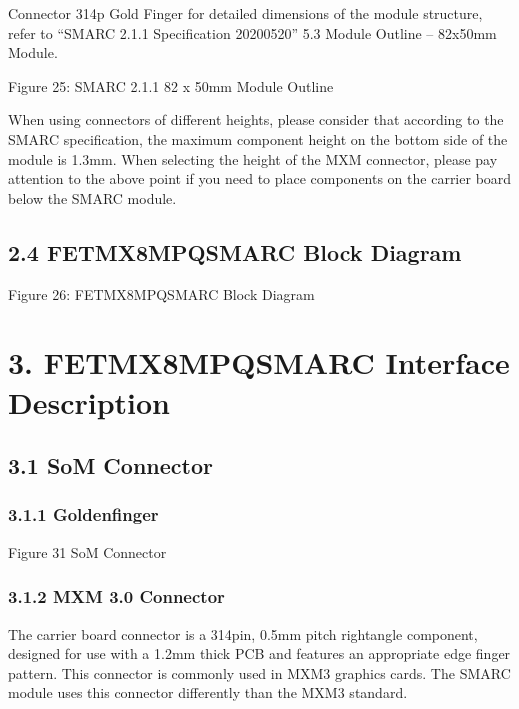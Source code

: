 \documentclass[letterpaper,10pt,openany,english]{sphinxmanual}
\begin{document}
\sphinxAtStartPar
Connector 314p Gold Finger for detailed dimensions of the module structure, refer to “SMARC 2.1.1 Specification 2020\sphinxhyphen{}05\sphinxhyphen{}20” 5.3 Module Outline – 82x50mm Module.

\sphinxAtStartPar
Figure 2\sphinxhyphen{}5: SMARC 2.1.1 82 x 50mm Module Outline

\sphinxAtStartPar
When using connectors of different heights, please consider that according to the SMARC specification, the maximum component height on the bottom side of the module is 1.3mm. When selecting the height of the MXM connector, please pay attention to the above point if you need to place components on the carrier board below the SMARC module.


\section{2.4 FET\sphinxhyphen{}MX8MPQ\sphinxhyphen{}SMARC Block Diagram}
\label{\detokenize{hardware:fet-mx8mpq-smarc-block-diagram}}
\sphinxAtStartPar
{}

\sphinxAtStartPar
Figure 2\sphinxhyphen{}6: FET\sphinxhyphen{}MX8MPQ\sphinxhyphen{}SMARC Block Diagram


\chapter{3. FET\sphinxhyphen{}MX8MPQ\sphinxhyphen{}SMARC Interface Description}
\label{\detokenize{hardware:fet-mx8mpq-smarc-interface-description}}

\section{3.1 SoM Connector}
\label{\detokenize{hardware:som-connector}}

\subsection{3.1.1 Golden\sphinxhyphen{}finger}
\label{\detokenize{hardware:golden-finger}}
\sphinxAtStartPar
{}

\sphinxAtStartPar
Figure 3\sphinxhyphen{}1 SoM Connector


\subsection{3.1.2 MXM 3.0 Connector}
\label{\detokenize{hardware:mxm-3-0-connector}}
\sphinxAtStartPar
The carrier board connector is a 314\sphinxhyphen{}pin, 0.5mm pitch right\sphinxhyphen{}angle component, designed for use with a 1.2mm thick PCB and features an appropriate edge finger pattern. This connector is commonly used in MXM3 graphics cards. The SMARC module uses this connector differently than the MXM3 standard.
\end{document}
